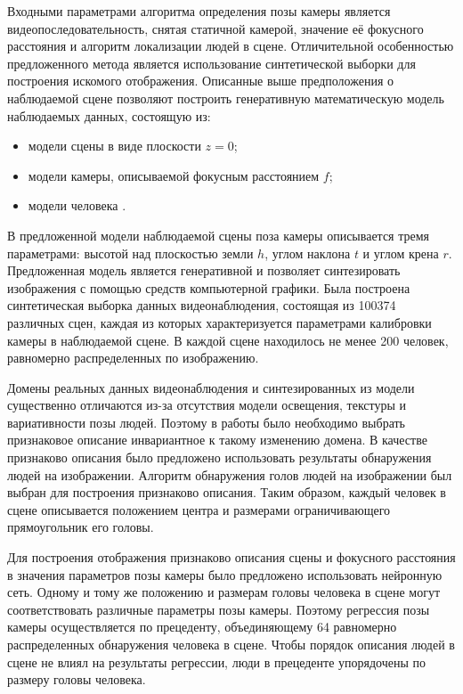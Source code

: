 Входными параметрами алгоритма определения позы камеры является видеопоследовательность, снятая статичной камерой, значение её фокусного расстояния и алгоритм локализации людей в сцене. Отличительной особенностью предложенного метода является использование синтетической выборки для построения искомого отображения. Описанные выше предположения о наблюдаемой сцене позволяют построить генеративную математическую модель наблюдаемых данных, состоящую из:
\begin{itemize}
	\item модели сцены в виде плоскости $z=0$;
	\item модели камеры, описываемой фокусным расстоянием $f$;
	\item модели человека \cite{pishchulin15arxiv}.
\end{itemize}
В предложенной модели наблюдаемой сцены поза камеры описывается тремя параметрами: высотой над плоскостью земли $h$, углом наклона $t$ и углом крена $r$. Предложенная модель является генеративной и позволяет синтезировать изображения с помощью средств компьютерной графики. Была построена синтетическая выборка данных видеонаблюдения, состоящая из 100374 различных сцен, каждая из которых характеризуется параметрами калибровки камеры в наблюдаемой сцене. В каждой сцене находилось не менее 200 человек, равномерно распределенных по изображению.

Домены реальных данных видеонаблюдения и синтезированных из модели существенно отличаются из-за отсутствия модели освещения, текстуры и вариативности позы людей. Поэтому в работы было необходимо выбрать признаковое описание инвариантное к такому изменению домена. В качестве признаково описания было предложено использовать результаты обнаружения людей на изображении. Алгоритм обнаружения голов людей на изображении \cite{prisacariu_reid_tr2310_09} был выбран для построения признаково описания. Таким образом, каждый человек в сцене описывается положением центра и размерами ограничивающего прямоугольник его головы.

Для построения отображения признаково описания сцены и фокусного расстояния в значения параметров позы камеры было предложено использовать нейронную сеть. Одному и тому же положению и размерам головы человека в сцене могут соответствовать различные параметры позы камеры. Поэтому регрессия позы камеры осуществляется по прецеденту, объединяющему 64 равномерно распределенных обнаружения человека в сцене. Чтобы порядок описания людей в сцене не влиял на результаты регрессии, люди в прецеденте упорядочены по размеру головы человека.


